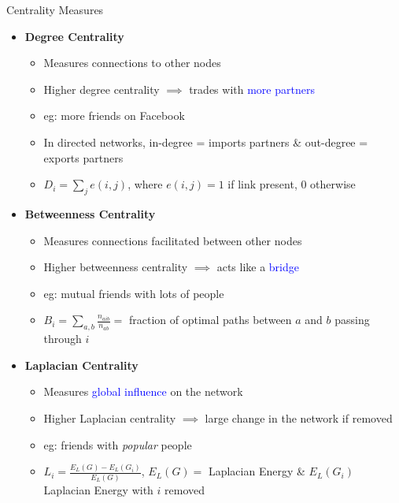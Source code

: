 \documentclass[10pt,xcolor={dvipsnames}]{beamer}
\begin{document}
\begin{frame}{Centrality Measures}
    \begin{itemize}\itemsep15pt
        \small
        \item[\ding{213}] \textbf{Degree Centrality}
            \scriptsize
            \begin{itemize}\itemsep0.4pt
                \item Measures connections to other nodes 
                \item Higher degree centrality $\implies$ trades with \textcolor{blue}{more partners}
                \item eg: more friends on Facebook 
                \item In directed networks, in-degree = imports partners \& out-degree = exports partners
                \item $D_i = \sum_j e(i,j)$, where $e(i,j) = 1$ if link present, $0$ otherwise
            \end{itemize}
            
        \small
        \item[\ding{213}] \textbf{Betweenness Centrality}
            \scriptsize
            \begin{itemize}\itemsep0.4pt
                \item Measures connections facilitated between other nodes
                \item Higher betweenness centrality $\implies$ acts like a \textcolor{blue}{bridge}
                \item eg: mutual friends with lots of people
                \item $B_i = \sum_{a,b} \frac{n_{aib}}{n_{ab}} = $  fraction of optimal paths between $a$ and $b$ passing through $i$
            \end{itemize}
        
        \small
        \item[\ding{213}] \textbf{Laplacian Centrality}
            \scriptsize
            \begin{itemize}\itemsep0.4pt
                \item Measures \textcolor{blue}{global influence} on the network
                \item Higher Laplacian centrality $\implies$ large change in the network if removed
                \item eg: friends with \textit{popular} people
                \item $L_i = \frac{E_L(G) - E_L(G_i)}{E_L(G)}$, $E_L(G) = $ Laplacian Energy \& $E_L(G_i)$ Laplacian Energy with $i$ removed
            \end{itemize}
    \end{itemize}
\end{frame}
\end{document}
